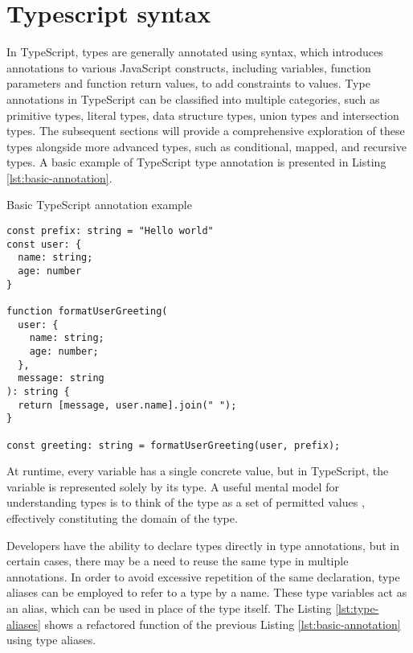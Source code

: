 \section{Typescript syntax}

In TypeScript, types are generally annotated using  syntax, which introduces annotations to various JavaScript constructs, including variables, function parameters and function return values, to add constraints to values. Type annotations in TypeScript can be classified into multiple categories, such as primitive types, literal types, data structure types, union types and intersection types. The subsequent sections will provide a comprehensive exploration of these types alongside more advanced types, such as conditional, mapped, and recursive types. A basic example of TypeScript type annotation is presented in Listing \ref{lst:basic-annotation}.

\begin{listing}[ht]
  \caption{Basic TypeScript annotation example}\label{lst:basic-annotation}
  \begin{verbatim}
const prefix: string = "Hello world"
const user: {
  name: string;
  age: number
}

function formatUserGreeting(
  user: {
    name: string;
    age: number;
  }, 
  message: string
): string {
  return [message, user.name].join(" ");
}

const greeting: string = formatUserGreeting(user, prefix); 
\end{verbatim}
\end{listing}

At runtime, every variable has a single concrete value, but in TypeScript, the variable is represented solely by its type. A useful mental model for understanding types is to think of the type as a set of permitted values \cite{vanderkamEffectiveTypeScript622019}, effectively constituting the domain of the type.

Developers have the ability to declare types directly in type annotations, but in certain cases, there may be a need to reuse the same type in multiple annotations. In order to avoid excessive repetition of the same declaration, type aliases can be employed to refer to a type by a name. These type variables act as an alias, which can be used in place of the type itself. The Listing \ref{lst:type-aliases} shows a refactored  function of the previous Listing \ref{lst:basic-annotation} using type aliases.

